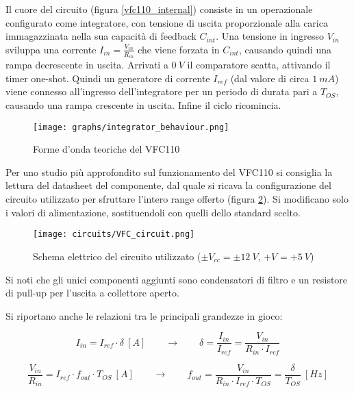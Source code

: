 Il cuore del circuito (figura \ref{vfc110_internal}) consiste in un operazionale configurato
come integratore, con tensione di uscita proporzionale alla carica immagazzinata nella sua
capacità di feedback $C_{int}$. Una tensione in ingresso $V_{in}$ sviluppa una corrente
$I_{in}=\frac{V_{in}}{R_{in}}$ che viene forzata in $C_{int}$, causando quindi una rampa
decrescente in uscita. Arrivati a $0\ V$ il comparatore scatta, attivando il timer one-shot.
Quindi un generatore di corrente $I_{ref}$ (dal valore di circa $1\ mA$) viene connesso
all'ingresso dell'integratore per un periodo di durata pari a $T_{OS}$, causando una rampa
crescente in uscita. Infine il ciclo ricomincia.

\begin{figure}[H]
    \centering
    \texttt{[image: graphs/integrator\_behaviour.png]}
    \caption{Forme d'onda teoriche del VFC110}
    \label{integrator_behaviour}
\end{figure}

Per uno studio più approfondito sul funzionamento del VFC110 si consiglia la lettura del
datasheet del componente, dal quale si ricava la configurazione del circuito utilizzato
per sfruttare l'intero range offerto (figura \ref{VFC_circuit}). Si modificano solo i valori
di alimentazione, sostituendoli con quelli dello standard scelto.

\begin{figure}[H]
    \centering
    \texttt{[image: circuits/VFC\_circuit.png]}
    \caption{Schema elettrico del circuito utilizzato ($\pm V_{cc}=\pm 12\ V$, $+V_{}=+5\ V$)}
    \label{VFC_circuit}
\end{figure}

Si noti che gli unici componenti aggiunti sono condensatori di filtro e un resistore di
pull-up per l'uscita a collettore aperto.

Si riportano anche le relazioni tra le principali grandezze in gioco:

\begin{equation}\label{duty_cycle}
    I_{in}=I_{ref}\cdot\delta\ [A]
    \qquad
    \rightarrow
    \qquad
    \delta=\frac{I_{in}}{I_{ref}}=\frac{V_{in}}{R_{in}\cdot I_{ref}}
\end{equation}

\begin{equation}\label{fout}
    \frac{V_{in}}{R_{in}}=I_{ref}\cdot f_{out}\cdot T_{OS}\ [A]
    \qquad
    \rightarrow
    \qquad
    f_{out}=\frac{V_{in}}{R_{in}\cdot I_{ref}\cdot T_{OS}}=\frac{\delta}{T_{OS}}\ [Hz]
\end{equation}

